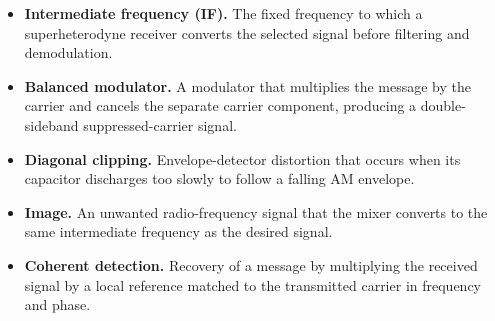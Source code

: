 \documentclass[12pt,a4paper]{article}
\begin{document}
\begin{tcolorbox}[defbox, title={One-Line Definitions}, title after break={One-Line Definitions (contd.)}]
\begin{itemize}[leftmargin=*, itemsep=3pt, topsep=0pt]
  \item \textbf{Intermediate frequency (IF).} The fixed frequency to which a superheterodyne receiver converts the selected signal before filtering and demodulation.
  \item \textbf{Balanced modulator.} A modulator that multiplies the message by the carrier and cancels the separate carrier component, producing a double-sideband suppressed-carrier signal.
  \item \textbf{Diagonal clipping.} Envelope-detector distortion that occurs when its capacitor discharges too slowly to follow a falling AM envelope.
  \item \textbf{Image.} An unwanted radio-frequency signal that the mixer converts to the same intermediate frequency as the desired signal.
  \item \textbf{Coherent detection.} Recovery of a message by multiplying the received signal by a local reference matched to the transmitted carrier in frequency and phase.
\end{itemize}
\end{tcolorbox}
\end{document}
